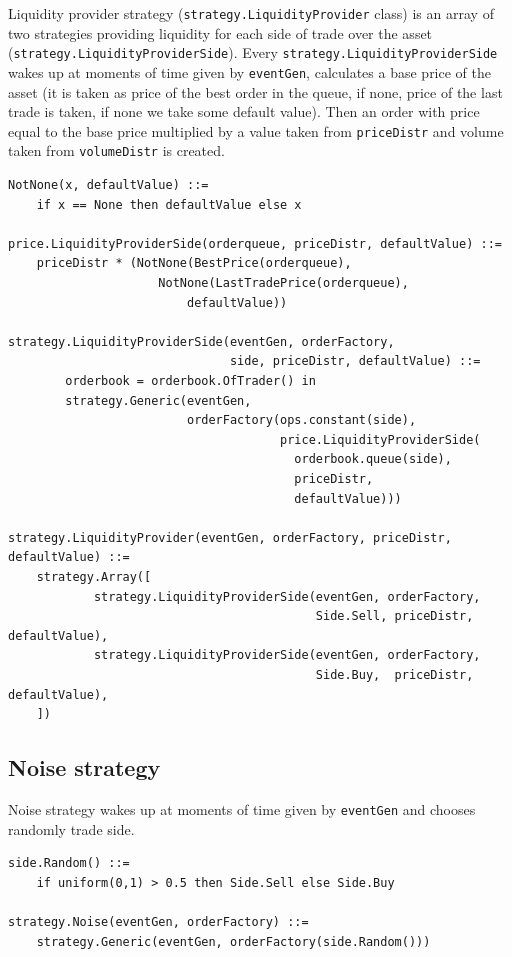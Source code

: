 \documentclass[a4paper,11pt]{article}
\begin{document}
Liquidity provider strategy (\texttt{strategy.LiquidityProvider} class)
is an array of two strategies providing liquidity for each side of trade
over the asset (\texttt{strategy.LiquidityProviderSide}). Every
\texttt{strategy.LiquidityProviderSide} wakes up at moments of time
given by \texttt{eventGen}, calculates a base price of the asset (it is
taken as price of the best order in the queue, if none, price of the
last trade is taken, if none we take some default value). Then an order
with price equal to the base price multiplied by a value taken from
\texttt{priceDistr} and volume taken from \texttt{volumeDistr} is
created.

\begin{verbatim}
NotNone(x, defaultValue) ::=
    if x == None then defaultValue else x

price.LiquidityProviderSide(orderqueue, priceDistr, defaultValue) ::=
    priceDistr * (NotNone(BestPrice(orderqueue),
                     NotNone(LastTradePrice(orderqueue),
                         defaultValue))

strategy.LiquidityProviderSide(eventGen, orderFactory, 
                               side, priceDistr, defaultValue) ::=
        orderbook = orderbook.OfTrader() in
        strategy.Generic(eventGen,
                         orderFactory(ops.constant(side),
                                      price.LiquidityProviderSide(
                                        orderbook.queue(side),
                                        priceDistr,
                                        defaultValue)))

strategy.LiquidityProvider(eventGen, orderFactory, priceDistr, defaultValue) ::=
    strategy.Array([
            strategy.LiquidityProviderSide(eventGen, orderFactory, 
                                           Side.Sell, priceDistr, defaultValue),
            strategy.LiquidityProviderSide(eventGen, orderFactory, 
                                           Side.Buy,  priceDistr, defaultValue),
    ])
\end{verbatim}
\subsection{Noise strategy}\label{noise-strategy}

Noise strategy wakes up at moments of time given by \texttt{eventGen}
and chooses randomly trade side.

\begin{verbatim}
side.Random() ::=
    if uniform(0,1) > 0.5 then Side.Sell else Side.Buy

strategy.Noise(eventGen, orderFactory) ::=
    strategy.Generic(eventGen, orderFactory(side.Random()))
\end{verbatim}
\end{document}
